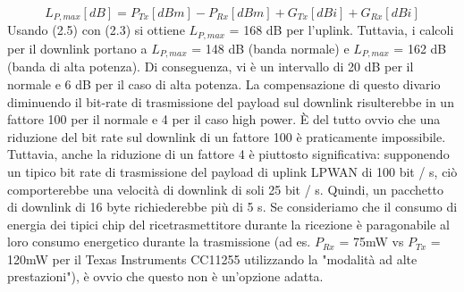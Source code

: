 \documentclass[a4paper]{report} %
\begin{document}
\begin{enumerate}
\begin{equation}
L_{P,max}[dB] = P_{Tx}[dBm] - P_{Rx}[dBm]+G_{Tx}[dBi] + G_{Rx}[dBi] 
\end{equation}  
Usando (2.5) con (2.3) si ottiene $L_{P, max}$ = 168 dB per l'uplink. Tuttavia, i calcoli per il downlink portano a $L_{P, max}$ = 148 dB (banda normale) e $L_{P, max}$ = 162 dB (banda di alta potenza). Di conseguenza, vi è un intervallo di 20 dB per il normale e 6 dB per il caso di alta potenza. La compensazione di questo divario diminuendo il bit-rate di trasmissione del payload sul downlink risulterebbe in un fattore 100 per il normale e 4 per il caso high power. È del tutto ovvio che una riduzione del bit rate sul downlink di un fattore 100 è praticamente impossibile. Tuttavia, anche la riduzione di un fattore 4 è piuttosto significativa: supponendo un tipico bit rate di trasmissione del payload di uplink LPWAN di 100 bit / s, ciò comporterebbe una velocità di downlink di soli 25 bit / s. Quindi, un pacchetto di downlink di 16 byte richiederebbe più di 5 s. Se consideriamo che il consumo di energia dei tipici chip del ricetrasmettitore durante la ricezione è paragonabile al loro consumo energetico durante la trasmissione (ad es. $P_{Rx}$ = 75mW vs $P_{Tx}$ = 120mW per il Texas Instruments CC11255 utilizzando la "modalità ad alte prestazioni"), è ovvio che questo non è un'opzione adatta.

\end{enumerate}
\end{document}
